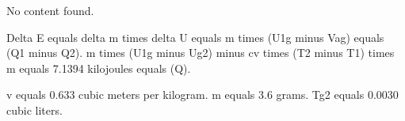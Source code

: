 No content found.

Delta E equals delta m times delta U equals m times (U1g minus Vag) equals (Q1 minus Q2). m times (U1g minus Ug2) minus cv times (T2 minus T1) times m equals 7.1394 kilojoules equals (Q).

v equals 0.633 cubic meters per kilogram. m equals 3.6 grams. Tg2 equals 0.0030 cubic liters.
